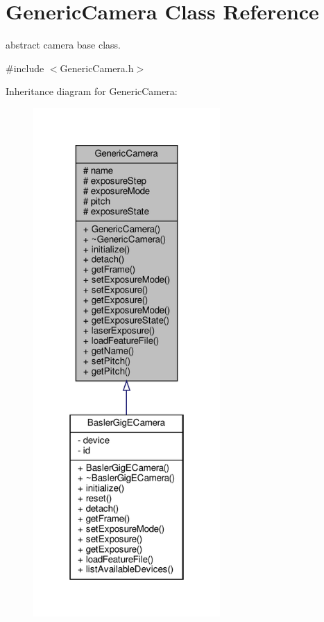 \hypertarget{class_generic_camera}{}\section{Generic\+Camera Class Reference}
\label{class_generic_camera}


abstract camera base class.  




{\ttfamily \#include $<$Generic\+Camera.\+h$>$}



Inheritance diagram for Generic\+Camera\+:\nopagebreak
\begin{figure}[H]
\begin{center}
\leavevmode
\includegraphics[height=550pt]{class_generic_camera__inherit__graph}
\end{center}
\end{figure}



